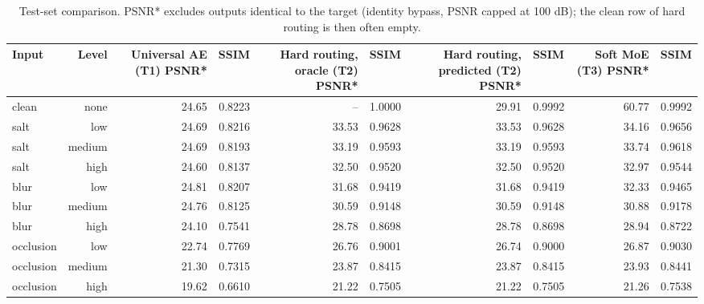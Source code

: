 \begin{table}[t]
\centering
\caption{Test-set comparison. PSNR* excludes outputs identical to the target (identity bypass, PSNR capped at 100 dB); the clean row of hard routing is then often empty.}
\label{tab:comparison_by_type_level}
\begin{tabular}{lrrrrrrrrr}
\toprule
Input & Level & Universal AE (T1) PSNR* & SSIM & Hard routing, oracle (T2) PSNR* & SSIM & Hard routing, predicted (T2) PSNR* & SSIM & Soft MoE (T3) PSNR* & SSIM \\
\midrule
clean & none & 24.65 & 0.8223 & -- & 1.0000 & 29.91 & 0.9992 & 60.77 & 0.9992 \\
salt & low & 24.69 & 0.8216 & 33.53 & 0.9628 & 33.53 & 0.9628 & 34.16 & 0.9656 \\
salt & medium & 24.69 & 0.8193 & 33.19 & 0.9593 & 33.19 & 0.9593 & 33.74 & 0.9618 \\
salt & high & 24.60 & 0.8137 & 32.50 & 0.9520 & 32.50 & 0.9520 & 32.97 & 0.9544 \\
blur & low & 24.81 & 0.8207 & 31.68 & 0.9419 & 31.68 & 0.9419 & 32.33 & 0.9465 \\
blur & medium & 24.76 & 0.8125 & 30.59 & 0.9148 & 30.59 & 0.9148 & 30.88 & 0.9178 \\
blur & high & 24.10 & 0.7541 & 28.78 & 0.8698 & 28.78 & 0.8698 & 28.94 & 0.8722 \\
occlusion & low & 22.74 & 0.7769 & 26.76 & 0.9001 & 26.74 & 0.9000 & 26.87 & 0.9030 \\
occlusion & medium & 21.30 & 0.7315 & 23.87 & 0.8415 & 23.87 & 0.8415 & 23.93 & 0.8441 \\
occlusion & high & 19.62 & 0.6610 & 21.22 & 0.7505 & 21.22 & 0.7505 & 21.26 & 0.7538 \\
\bottomrule
\end{tabular}
\end{table}
